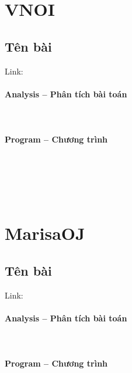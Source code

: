 \documentclass{article}
\begin{document}
\section{VNOI}

\subsection{Tên bài}
Link: \url{}


\paragraph{Analysis -- Phân tích bài toán} \mbox{} \\


\paragraph{Program -- Chương trình} \mbox{} \\


\begin{lstlisting}

	
\end{lstlisting}

\section{MarisaOJ}

\subsection{Tên bài}
Link: \url{}
 

\paragraph{Analysis -- Phân tích bài toán} \mbox{} \\


\paragraph{Program -- Chương trình} \mbox{} \\


\begin{lstlisting}

	
\end{lstlisting}

\end{document}
